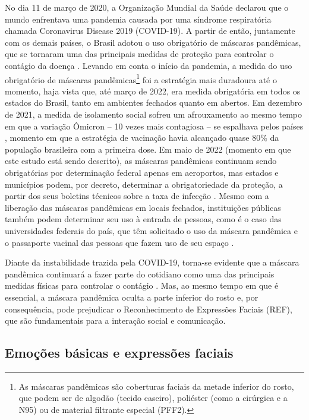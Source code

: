 \documentclass[portuguese]{textolivre}
\begin{document}
No dia 11 de março de 2020, a Organização Mundial da Saúde declarou que o mundo enfrentava uma pandemia causada por uma síndrome respiratória chamada Coronavirus Disease 2019 (COVID-19). A partir de então, juntamente com os demais países, o Brasil adotou o uso obrigatório de máscaras pandêmicas, que se tornaram uma das principais medidas de proteção para controlar o contágio da doença \cite{brasil_lei_2020}. Levando em conta o início da pandemia, a medida do uso obrigatório de máscaras pandêmicas\footnote{As máscaras pandêmicas são coberturas faciais da metade inferior do rosto, que podem ser de
algodão (tecido caseiro), poliéster (como a cirúrgica e a N95) ou de material filtrante especial (PFF2).} foi a estratégia mais duradoura até o momento, haja vista que, até março de 2022, era medida obrigatória em todos os estados do Brasil, tanto em ambientes fechados quanto em abertos. Em dezembro de 2021, a medida de isolamento social sofreu um afrouxamento ao mesmo tempo em que a variação Ômicron – 10 vezes mais contagiosa – se espalhava pelos países \cite{chen_extremely_2022}, momento em que a estratégia de vacinação havia alcançado quase 80\% da população brasileira com a primeira dose. Em maio de 2022 (momento em que este estudo está sendo descrito), as máscaras pandêmicas continuam sendo obrigatórias por determinação federal apenas em aeroportos, mas estados e municípios podem, por decreto, determinar a obrigatoriedade da proteção, a partir dos seus boletins técnicos sobre a taxa de infecção \cite{brasil_anvisa_2022}. Mesmo com a liberação das máscaras pandêmicas em locais fechados, instituições públicas também podem determinar seu uso à entrada de pessoas, como é o caso das universidades federais do país, que têm solicitado o uso da máscara pandêmica e o passaporte vacinal das pessoas que fazem uso de seu espaço \cite{capital_usp_2022}.  


Diante da instabilidade trazida pela COVID-19, torna-se evidente que a máscara pandêmica continuará a fazer parte do cotidiano como uma das principais medidas físicas para controlar o contágio \cite{ferguson_report_2020}. Mas, ao mesmo tempo em que é essencial, a máscara pandêmica oculta a parte inferior do rosto e, por consequência, pode prejudicar o Reconhecimento de Expressões Faciais (REF), que são fundamentais para a interação social e comunicação. 

\subsection{Emoções básicas e expressões faciais }\label{sec-conduta}
\end{document}
